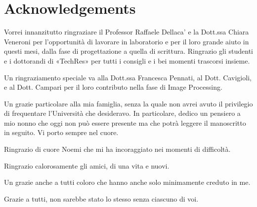 \section*{Acknowledgements}

Vorrei innanzitutto ringraziare il Professor Raffaele Dellaca' e la
Dott.ssa Chiara Veneroni per l'opportunità di lavorare in laboratorio
e per il loro grande aiuto in questi mesi, dalla fase di progettazione
a quella di scrittura.  Ringrazio gli studenti e i dottorandi di
«TechRes» per tutti i consigli e i bei momenti trascorsi insieme.

Un ringraziamento speciale va alla Dott.ssa Francesca Pennati, al
Dott. Cavigioli, e al Dott. Campari per il loro contributo nella fase
di Image Processing.

Un grazie particolare alla mia famiglia, senza la quale non avrei
avuto il privilegio di frequentare l'Università che desideravo.  In
particolare, dedico un pensiero a mio nonno che oggi non può essere
presente ma che potrà leggere il manoscritto in seguito.  Vi porto
sempre nel cuore.

Ringrazio di cuore Noemi che mi ha incoraggiato nei momenti di
difficoltà.

Ringrazio calorosamente gli amici, di una vita e nuovi.

Un grazie anche a tutti coloro che hanno anche solo minimamente
creduto in me.

Grazie a tutti, non sarebbe stato lo stesso senza ciascuno di voi.

